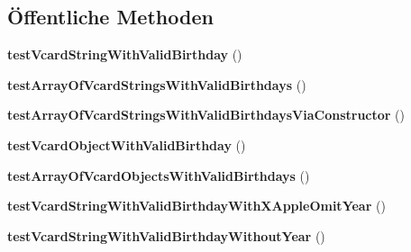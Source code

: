 \subsection*{Öffentliche Methoden}
\begin{DoxyCompactItemize}
\item 
\mbox{\label{class_sabre_1_1_v_object_1_1_birthday_calendar_generator_test_a2a12fc446f68f27e3bcb315de697cfd8}} 
{\bfseries test\+Vcard\+String\+With\+Valid\+Birthday} ()
\item 
\mbox{\label{class_sabre_1_1_v_object_1_1_birthday_calendar_generator_test_a7069bbeaa4f1fbcabe89c76eea0d0662}} 
{\bfseries test\+Array\+Of\+Vcard\+Strings\+With\+Valid\+Birthdays} ()
\item 
\mbox{\label{class_sabre_1_1_v_object_1_1_birthday_calendar_generator_test_afa10c99160944e8fbe376b41bab55a37}} 
{\bfseries test\+Array\+Of\+Vcard\+Strings\+With\+Valid\+Birthdays\+Via\+Constructor} ()
\item 
\mbox{\label{class_sabre_1_1_v_object_1_1_birthday_calendar_generator_test_aedc4e3fbc1f2064986de9149a484d188}} 
{\bfseries test\+Vcard\+Object\+With\+Valid\+Birthday} ()
\item 
\mbox{\label{class_sabre_1_1_v_object_1_1_birthday_calendar_generator_test_a86f7ff1494587f8c9286848a5e509258}} 
{\bfseries test\+Array\+Of\+Vcard\+Objects\+With\+Valid\+Birthdays} ()
\item 
\mbox{\label{class_sabre_1_1_v_object_1_1_birthday_calendar_generator_test_a0050a96c401eeef8a7fc24dfcaef33f8}} 
{\bfseries test\+Vcard\+String\+With\+Valid\+Birthday\+With\+X\+Apple\+Omit\+Year} ()
\item 
\mbox{\label{class_sabre_1_1_v_object_1_1_birthday_calendar_generator_test_aae4ffd89593993a087b7befaf6dd8464}} 
{\bfseries test\+Vcard\+String\+With\+Valid\+Birthday\+Without\+Year} ()

\end{DoxyCompactItemize}
